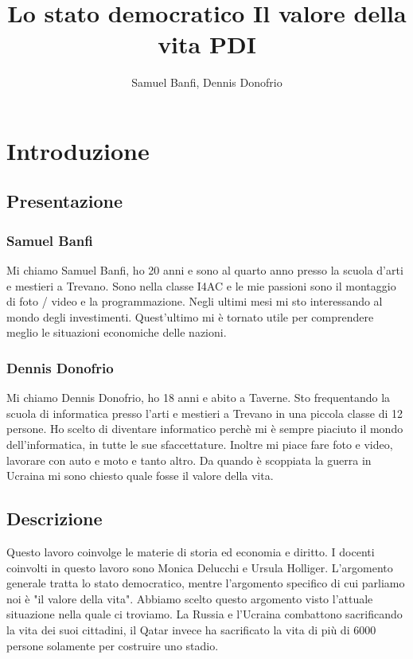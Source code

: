 \documentclass[a4paper, 12pt]{article}
\title{Lo stato democratico\break
Il valore della vita PDI}
\author{Samuel Banfi, Dennis Donofrio}
\date{}
\begin{document}
\maketitle

\pagebreak

\tableofcontents

\pagebreak

\onehalfspacing

\section{Introduzione}

\subsection{Presentazione}

\subsubsection{Samuel Banfi}

Mi chiamo Samuel Banfi, ho 20 anni e sono al quarto anno presso la scuola d'arti e mestieri a Trevano. Sono nella classe I4AC e le mie passioni sono il montaggio di foto / video e la programmazione. Negli ultimi mesi mi sto interessando al mondo degli investimenti. Quest'ultimo mi è tornato utile per comprendere meglio le situazioni economiche delle nazioni.

\subsubsection{Dennis Donofrio}

Mi chiamo Dennis Donofrio, ho 18 anni e abito a Taverne. Sto frequentando la scuola di informatica presso l'arti e mestieri a Trevano in una piccola classe di 12 persone. Ho scelto di diventare informatico perchè mi è sempre piaciuto il mondo dell'informatica, in tutte le sue sfaccettature. Inoltre mi piace fare foto e video, lavorare con auto e moto e tanto altro. Da quando è scoppiata la guerra in Ucraina mi sono chiesto quale fosse il valore della vita.

\subsection{Descrizione}

Questo lavoro coinvolge le materie di storia ed economia e diritto. I docenti coinvolti in questo lavoro sono Monica Delucchi e Ursula Holliger. L'argomento generale tratta lo stato democratico, mentre l'argomento specifico di cui parliamo noi è "il valore della vita". Abbiamo scelto questo argomento visto l'attuale situazione nella quale ci troviamo. La Russia e l'Ucraina combattono sacrificando la vita dei suoi cittadini, il Qatar invece ha sacrificato la vita di più di 6000 persone solamente per costruire uno stadio.
\end{document}
